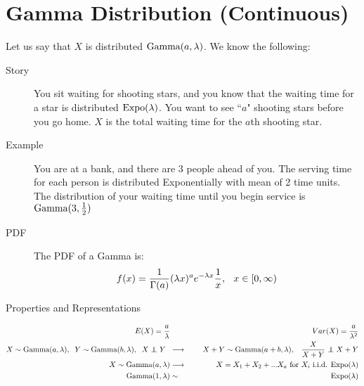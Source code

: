 \documentclass[11pt]{article}
\theoremstyle{definition}
\theoremstyle{remark}
\newcommand\independent{\protect\mathpalette{\protect\independenT}{\perp}}
\def\independenT#1#2{\mathrel{\rlap{$#1#2$}\mkern2mu{#1#2}}}
\newcommand{\Expo}{\textnormal{Expo}}
\newcommand{\Gam}{\textnormal{Gamma}}
\begin{document}
\section{Gamma Distribution (Continuous)}
\begin{description}
\item Let us say that $X$ is distributed $\Gam(a, \lambda)$. We know the following:
\begin{description}
	\item[Story] You sit waiting for shooting stars, and you know that the waiting time for a star is distributed $\Expo(\lambda)$. You want to see ``$a$" shooting stars before you go home. $X$ is the total waiting time for the $a$th shooting star.
	\item[Example]	You are at a bank, and there are 3 people ahead of you. The serving time for each person is distributed Exponentially with mean of 2 time units. The distribution of your waiting time until you begin service is $\Gam(3, \frac{1}{2})$
	\item[PDF] The PDF of a Gamma is:
\begin{eqnarray*}
f(x) = \frac{1}{\Gamma(a)}(\lambda x)^ae^{-\lambda x}\frac{1}{x},
\hspace{.1 in}
x \in [0, \infty)
\end{eqnarray*}
	\item[Properties and Representations]
\end{description}
\end{description}
\vspace{-.4 cm}
	\begin{eqnarray*}
		E(X) = \frac{a}{\lambda} && Var(X) = \frac{a}{\lambda^2} \\
		X \sim \Gam(a, \lambda), \hspace{.2 cm} Y \sim \Gam(b, \lambda), \hspace{.2 cm} X \independent Y \hspace{.2 cm} &\longrightarrow& \hspace{.5cm} X + Y \sim \Gam(a + b, \lambda), \hspace{.3cm} \frac{X}{X + Y} \independent X + Y \\
		X \sim \Gam(a, \lambda) &\longrightarrow& X = X_1 + X_2 + ... X_a \textnormal{ for $X_i$ i.i.d. $\Expo(\lambda)$} \\
		\Gam(1, \lambda) &\sim& \Expo(\lambda) 
	\end{eqnarray*}

\pagebreak
\end{document}
